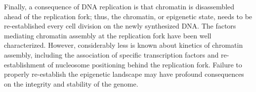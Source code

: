 Finally, a consequence of DNA replication is that chromatin is disassembled ahead of the replication fork; thus, the chromatin, or epigenetic state, needs to be re-established every cell division on the newly synthesized DNA.  The factors mediating chromatin assembly at the replication fork have been well characterized\citep{MacAlpine2013-ds}. However, considerably less is known about \invivo kinetics of chromatin assembly, including the association of specific transcription factors and re-establishment of nucleosome positioning behind the replication fork. Failure to properly re-establish the epigenetic landscape may have profound consequences on the integrity and stability of the genome.





















